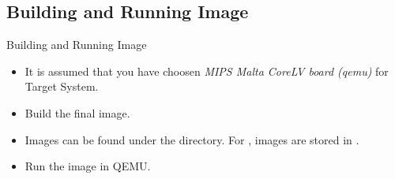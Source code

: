 \subsection{Building and Running Image}
\begin{frame}[fragile]{Building and Running Image}
    \pause
    \begin{itemize}[<+-|alert@+>]
        \item It is assumed that you have choosen \textit{MIPS Malta CoreLV board (qemu)} for Target System.
        \item Build the final image. \\
        \item Images can be found under the  directory. For , images are stored in .
        \item Run the image in QEMU. \\
    \end{itemize}
\end{frame}